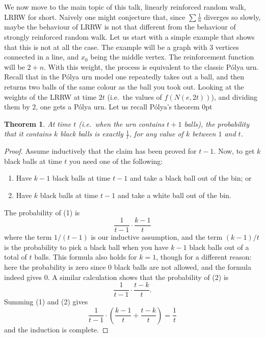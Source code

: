 \documentclass{emsprocart}
\theoremstyle{plain}
\newtheorem{thm}{Theorem}
\begin{document}
We now move to the main topic of this talk, linearly reinforced random
walk, LRRW for short. Naively one might conjecture that, since $\sum\frac{1}{n}$
diverges so slowly, maybe the behaviour of LRRW is not that different
from the behaviour of strongly reinforced random walk. Let us start
with a simple example that shows that this is not at all the case.
The example will be a graph with $3$ vertices connected in a line,
and $x_{0}$ being the middle vertex. The reinforcement function will
be $2+n$. With this weight, the process is equivalent to the classic
P\'olya urn. Recall that in the P\'olya urn model one repeatedly
takes out a ball, and then returns two balls of the same colour as
the ball you took out. Looking at the weights of the LRRW at time
$2t$ (i.e.\ the values of $f(N(e,2t))$), and dividing them by $2$,
one gets a P\'olya urn. Let us recall P\'olya's theorem \cite{P30}\newdimen\wide
\newdimen\high
\wide=10.4cm
\high=2.2cm
 0pt \hsize 0pt \hsize 0pt \hsize 0pt \hsize 0pt \hsize 0pt \wide 0pt \wide 0pt \hsize
{}
\begin{thm}
\label{thm:polya}At time $t$ (i.e.\ when the urn contains $t+1$
balls), the probability that it contains $k$ black balls is exactly
$\frac{1}{t}$, for any value of $k$ between $1$ and $t$.\end{thm}
\begin{proof}
Assume inductively that the claim has been proved for $t-1$. Now,
to get $k$ black balls at time $t$ you need one of the following:
\begin{enumerate}
\item Have $k-1$ black balls at time $t-1$ and take a black ball out of
the bin; or
\item Have $k$ black balls at time $t-1$ and take a white ball out of
the bin.
\end{enumerate}
The probability of (1) is 
\[
\frac{1}{t-1}\cdot\frac{k-1}{t}
\]
where the term $1/(t-1)$ is our inductive assumption, and the term
$(k-1)/t$ is the probability to pick a black ball when you have $k-1$
black balls out of a total of $t$ balls. This formula also holds
for $k=1$, though for a different reason: here the probability is
zero since $0$ black balls are not allowed, and the formula indeed
gives $0$. A similar calculation shows that the probability of (2)
is 
\[
\frac{1}{t-1}\cdot\frac{t-k}{t}.
\]
Summing (1) and (2) gives
\[
\frac{1}{t-1}\cdot\left(\frac{k-1}{t}+\frac{t-k}{t}\right)=\frac{1}{t}
\]
and the induction is complete.
\end{proof}
\end{document}
